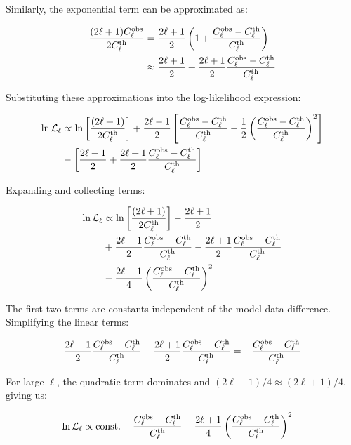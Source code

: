 \documentclass[11pt]{article}
\theoremstyle{definition}
\begin{document}
Similarly, the exponential term can be approximated as:

\begin{align}
\frac{(2\ell+1)C_\ell^{\rm obs}}{2C_\ell^{\rm th}} &= \frac{2\ell+1}{2}\left(1 + \frac{C_\ell^{\rm obs} - C_\ell^{\rm th}}{C_\ell^{\rm th}}\right) \\
&\approx \frac{2\ell+1}{2} + \frac{2\ell+1}{2}\frac{C_\ell^{\rm obs} - C_\ell^{\rm th}}{C_\ell^{\rm th}}
\end{align}

Substituting these approximations into the log-likelihood expression:

\begin{align}
\ln\mathcal{L}_\ell &\propto \ln\left[\frac{(2\ell+1)}{2C_\ell^{\rm th}}\right] + \frac{2\ell-1}{2}\left[\frac{C_\ell^{\rm obs} - C_\ell^{\rm th}}{C_\ell^{\rm th}} - \frac{1}{2}\left(\frac{C_\ell^{\rm obs} - C_\ell^{\rm th}}{C_\ell^{\rm th}}\right)^2\right] \\
&- \left[\frac{2\ell+1}{2} + \frac{2\ell+1}{2}\frac{C_\ell^{\rm obs} - C_\ell^{\rm th}}{C_\ell^{\rm th}}\right]
\end{align}

Expanding and collecting terms:

\begin{align}
\ln\mathcal{L}_\ell &\propto \ln\left[\frac{(2\ell+1)}{2C_\ell^{\rm th}}\right] - \frac{2\ell+1}{2} \\
&+ \frac{2\ell-1}{2}\frac{C_\ell^{\rm obs} - C_\ell^{\rm th}}{C_\ell^{\rm th}} - \frac{2\ell+1}{2}\frac{C_\ell^{\rm obs} - C_\ell^{\rm th}}{C_\ell^{\rm th}} \\
&- \frac{2\ell-1}{4}\left(\frac{C_\ell^{\rm obs} - C_\ell^{\rm th}}{C_\ell^{\rm th}}\right)^2
\end{align}

The first two terms are constants independent of the model-data difference. Simplifying the linear terms:

\begin{align}
\frac{2\ell-1}{2}\frac{C_\ell^{\rm obs} - C_\ell^{\rm th}}{C_\ell^{\rm th}} - \frac{2\ell+1}{2}\frac{C_\ell^{\rm obs} - C_\ell^{\rm th}}{C_\ell^{\rm th}} = -\frac{C_\ell^{\rm obs} - C_\ell^{\rm th}}{C_\ell^{\rm th}}
\end{align}

For large $\ell$, the quadratic term dominates and $(2\ell-1)/4 \approx (2\ell+1)/4$, giving us:

\begin{align}
\ln\mathcal{L}_\ell &\propto \text{const.} -\frac{C_\ell^{\rm obs} - C_\ell^{\rm th}}{C_\ell^{\rm th}} - \frac{2\ell+1}{4}\left(\frac{C_\ell^{\rm obs} - C_\ell^{\rm th}}{C_\ell^{\rm th}}\right)^2
\end{align}
\end{document}
